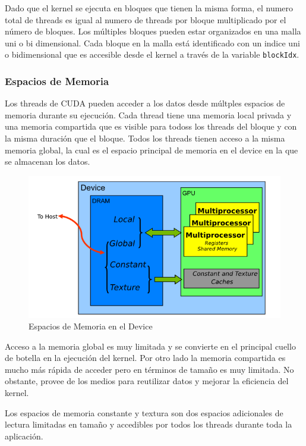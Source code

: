 \documentclass[]{article}
\begin{document}
Dado que el kernel se ejecuta en bloques que tienen la misma forma, el
numero total de threads es igual al numero de threads por bloque
multiplicado por el número de bloques. Los múltiples bloques pueden
estar organizados en una malla uni o bi dimensional. Cada bloque en la
malla está identificado con un indice uni o bidimensional que es
accesible desde el kernel a través de la variable \texttt{blockIdx}.

\subsubsection{Espacios de Memoria}\label{espacios-de-memoria}

Los threads de CUDA pueden acceder a los datos desde múltples espacios
de memoria durante su ejecución. Cada thread tiene una memoria local
privada y una memoria compartida que es visible para todoss los threads
del bloque y con la misma duración que el bloque. Todos los threads
tienen acceso a la misma memoria global, la cual es el espacio principal
de memoria en el device en la que se almacenan los datos.

\begin{figure}
\centering
\includegraphics{img/memoria_cuda.png}
\caption{Espacios de Memoria en el Device}
\end{figure}

Acceso a la memoria global es muy limitada y se convierte en el
principal cuello de botella en la ejecución del kernel. Por otro lado la
memoria compartida es mucho más rápida de acceder pero en términos de
tamaño es muy limitada. No obstante, provee de los medios para
reutilizar datos y mejorar la eficiencia del kernel.

Los espacios de memoria constante y textura son dos espacios adicionales
de lectura limitadas en tamaño y accedibles por todos los threads
durante toda la aplicación.
\end{document}
